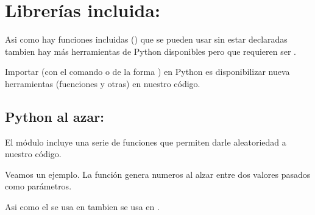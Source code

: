 \documentclass[a5paper,9pt,spanish]{sphinxmanual}
\begin{document}
\sphinxstepscope


\chapter{Librerías incluida: }
\label{\detokenize{random:librerias-incluida-random}}\label{\detokenize{random::doc}}
\sphinxAtStartPar
Asi como hay funciones incluidas () que se pueden usar sin
estar declaradas tambien hay más herramientas de Python disponibles pero
que requieren ser .

\sphinxAtStartPar
Importar (con el comando  o de la forma )
en Python es disponibilizar nueva herramientas (fuenciones y otras) en
nuestro código.


\section{Python al azar: }
\label{\detokenize{random:python-al-azar-random}}
\sphinxAtStartPar
El módulo  incluye una serie de funciones que permiten
darle aleatoriedad a nuestro código.

\sphinxAtStartPar
Veamos un ejemplo. La función  genera numeros al alzar
entre dos valores pasados como parámetros.

\begin{sphinxVerbatim}[commandchars=\\\{\}]
   

   

 
   
\end{sphinxVerbatim}

\sphinxAtStartPar
Asi como el  se usa en  tambien se usa
en .
\end{document}
